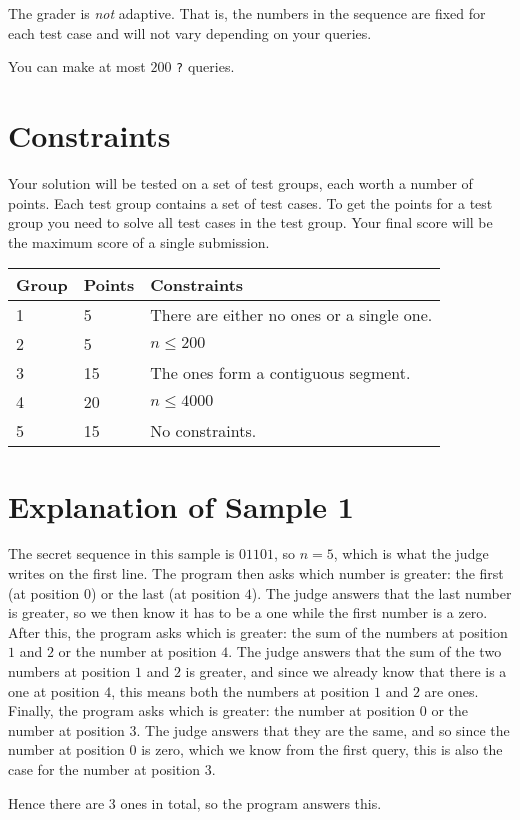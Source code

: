 The grader is \emph{not} adaptive.
That is, the numbers in the sequence are fixed for each test case and will not vary depending on your queries.

You can make at most $200$ \texttt{?} queries.

\section*{Constraints}
Your solution will be tested on a set of test groups, each worth a number of points.
Each test group contains a set of test cases.
To get the points for a test group you need to solve all test cases in the test group.
Your final score will be the maximum score of a single submission.

\noindent
\begin{tabular}{| l | l | l |}
\hline
Group & Points & Constraints \\ \hline
1     & 5     & There are either no ones or a single one. \\ \hline
2     & 5     & $n \leq 200$ \\ \hline
3     & 15    & The ones form a contiguous segment. \\ \hline
4     & 20    & $n \leq 4000$ \\ \hline
5     & 15    & No constraints. \\ \hline
\end{tabular}

\section*{Explanation of Sample 1}
The secret sequence in this sample is $01101$, so $n = 5$, which is what the judge writes on the first line.
The program then asks which number is greater: the first (at position $0$) or the last (at position $4$).
The judge answers that the last number is greater, so we then know it has to be a one while the first number is a zero.
After this, the program asks which is greater: the sum of the numbers at position $1$ and $2$ or the number at position $4$.
The judge answers that the sum of the two numbers at position $1$ and $2$ is greater, and since we already
know that there is a one at position $4$, this means both the numbers at position $1$ and $2$ are ones.
Finally, the program asks which is greater: the number at position $0$ or the number at position $3$.
The judge answers that they are the same, and so since the number at position $0$ is zero, which we know
from the first query, this is also the case for the number at position $3$.

Hence there are $3$ ones in total, so the program answers this.
